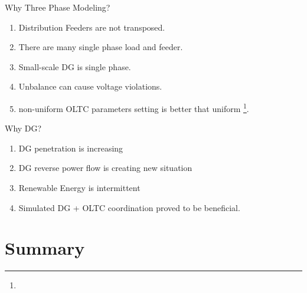 \documentclass[10pt]{beamer}
\begin{document}
\begin{frame}{Why Three Phase Modeling?}
\begin{enumerate}
\item Distribution Feeders are not transposed.
\item There are many single phase load and feeder.
\item Small-scale DG is single phase.
\item Unbalance can cause voltage violations.
\item non-uniform OLTC parameters setting is better that uniform  \footnote{}.
\end{enumerate}
\end{frame}

\begin{frame}{Why DG?}
\begin{enumerate}
\item DG penetration is increasing
\item DG reverse power flow is creating new situation
\item Renewable Energy is intermittent
\item Simulated  DG + OLTC coordination proved to be beneficial.
\end{enumerate}
\end{frame}




\section*{Summary}
\end{document}
